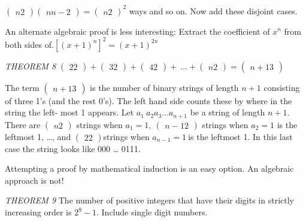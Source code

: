 \documentclass[10pt,letter]{article}
\begin{document}
\(\begin{pmatrix}
n
2
\end{pmatrix}
\begin{pmatrix}
n
n - 2
\end{pmatrix}
 =
\begin{pmatrix}
n
2
\end{pmatrix}
^{2}\) ways and so on. Now add these disjoint cases.

An alternate algebraic proof is less interesting: Extract the
coefficient of \(x^{n}\) from both sides
of.\(\left\lbrack \left( x + 1 \right)^{n} \right\rbrack^{2} = \left( x + 1 \right)^{2n}\)

\emph{THEOREM 8} \(\begin{pmatrix}
2
2
\end{pmatrix}
 +
\begin{pmatrix}
3
2
\end{pmatrix}
 +
\begin{pmatrix}
4
2
\end{pmatrix}
 + \ \ldots +
\begin{pmatrix}
n
2
\end{pmatrix}
 =
\begin{pmatrix}
n + 1
3
\end{pmatrix}
\)

The term \(\begin{pmatrix}
n + 1
3
\end{pmatrix}
\) is the number of binary strings of length \(n + 1\)
consisting of three 1's (and the rest 0's). The left hand side counts
these by where in the string the left- most 1 appears. Let
\(a_{1}\ a_{2}a_{3}\ldots a_{n + 1}\) be a string of length \(n + 1\).
There are \(\begin{pmatrix}
n
2
\end{pmatrix}
\) strings when \(a_{1} = 1,\
\begin{pmatrix}
n - 1
2
\end{pmatrix}
\) strings when \(a_{2} = 1\) is the leftmost 1, \ldots{},
and \(\begin{pmatrix}
2
2
\end{pmatrix}
\)strings when \(a_{n - 1} = 1\ \)is the leftmost 1. In
this last case the string looks like 000 \ldots{} 0111.

Attempting a proof by mathematical induction is an easy option. An
algebraic approach is not!

\emph{THEOREM 9} The number of positive integers that have their digits
in strictly increasing order is \(2^{9} - 1\). Include single digit
numbers.
\end{document}
